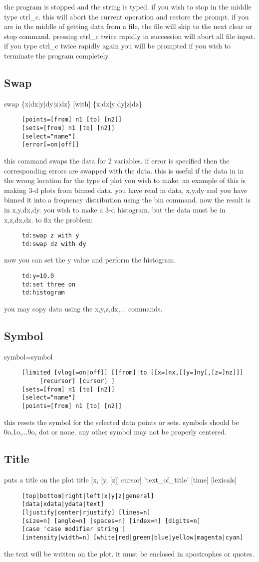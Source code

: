 the  program  is stopped and the string is typed.  if you wish to stop in
the middle type ctrl\_c.   this  will  abort  the  current  operation  and
restore  the  prompt.   if  you  are in the middle of getting data from a
file, the file will skip to the next clear  or  stop  command.   pressing
ctrl\_c  twice  rapidly  in  succession will abort all file input.  if you
type ctrl\_c twice rapidly again you will  be  prompted  if  you  wish  to
terminate the program completely.  
\subsection{Swap}
swap \{x$|$dx$|$y$|$dy$|$z$|$dz\} [with] \{x$|$dx$|$y$|$dy$|$z$|$dz\} 
\begin{verbatim}
     [points=[from] n1 [to] [n2]] 
     [sets=[from] n1 [to] [n2]] 
     [select="name"] 
     [error[=on|off]] 
\end{verbatim}
this  command swaps the data for 2 variables.  if error is specified then
the corresponding errors are swapped with the data.  this  is  useful  if
the  data in in the wrong location for the type of plot you wish to make.
an example of this is making 3-d plots from binned data.  you  have  read
in  data,  x,y,dy  and  you  have binned it into a frequency distribution
using the bin command.  now the result is in x,y,dx,dy.  you wish to make
a 3-d histogram, but the data must be in x,z,dx,dz.  to fix the problem: 
\begin{verbatim}
     td:swap z with y 
     td:swap dz with dy 
\end{verbatim}
now you can set the y value and perform the histogram.  
\begin{verbatim}
     td:y=10.0 
     td:set three on 
     td:histogram 
\end{verbatim}
you may copy data using the x,y,z,dx,...  commands.  
\subsection{Symbol}
symbol=symbol 
\begin{verbatim}
     [limited [vlog[=on|off]] [[from]|to [[x=]nx,[[y=]ny[,[z=]nz]]]
          [recursor] [cursor] ] 
     [sets=[from] n1 [to] [n2]] 
     [select="name"] 
     [points=[from] n1 [to] [n2]] 
\end{verbatim}
this  resets  the  symbol  for the selected data points or sets.  symbols
should be 0o,1o,...9o, dot or none.  any other symbol may not be properly
centered.  
\subsection{Title}
puts a title on the plot 
title [x, [y, [z]]$|$cursor] 'text\_of\_title' [time] [lexicals] 
\begin{verbatim}
     [top|bottom|right|left|x|y|z|general] 
     [data|xdata|ydata|text] 
     [ljustify|center|rjustify] [lines=n] 
     [size=n] [angle=n] [spaces=n] [index=n] [digits=n] 
     [case 'case modifier string'] 
     [intensity|width=n] [white|red|green|blue|yellow|magenta|cyan] 
\end{verbatim}
the text will be written on the plot.  it must be enclosed in apostrophes
or quotes.  
